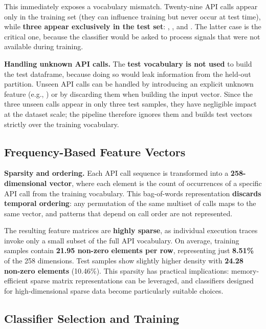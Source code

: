 This immediately exposes a vocabulary mismatch. Twenty-nine API calls appear only in the training set (they can influence training but never occur at test time), while \textbf{three appear exclusively in the test set}: , , and . The latter case is the critical one, because the classifier would be asked to process signals that were not available during training.

\textbf{Handling unknown API calls.} The \textbf{test vocabulary is not used} to build the test dataframe, because doing so would leak information from the held-out partition. Unseen API calls can be handled by introducing an explicit unknown feature (e.g., ) or by discarding them when building the input vector. Since the three unseen calls appear in only three test samples, they have negligible impact at the dataset scale; the pipeline therefore ignores them and builds test vectors strictly over the training vocabulary.

\subsection{Frequency-Based Feature Vectors} \label{subsec:task1_features}

\textbf{Sparsity and ordering.} Each API call sequence is transformed into a \textbf{258-dimensional vector}, where each element is the count of occurrences of a specific API call from the training vocabulary. This bag-of-words representation \textbf{discards temporal ordering}: any permutation of the same multiset of calls maps to the same vector, and patterns that depend on call order are not represented.

The resulting feature matrices are \textbf{highly sparse}, as individual execution traces invoke only a small subset of the full API vocabulary. On average, training samples contain \textbf{21.95 non-zero elements per row}, representing just \textbf{8.51\%} of the 258 dimensions. Test samples show slightly higher density with \textbf{24.28 non-zero elements} (10.46\%). This sparsity has practical implications: memory-efficient sparse matrix representations can be leveraged, and classifiers designed for high-dimensional sparse data become particularly suitable choices.

\subsection{Classifier Selection and Training} \label{subsec:task1_classifier}

